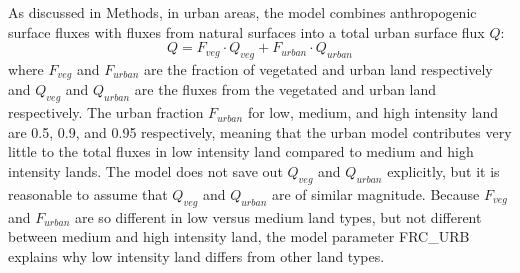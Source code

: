 
As discussed in Methods, in urban areas, the model combines anthropogenic surface fluxes with fluxes from natural surfaces into a total urban surface flux $Q$:
$$ Q= F_{veg} \cdot Q_{veg} + F_{urban} \cdot Q_{urban}$$
where $F_{veg}$ and $F_{urban}$ are the fraction of vegetated and urban land respectively and $Q_{veg}$ and $Q_{urban}$ are the fluxes from the vegetated and urban land respectively. 
The urban fraction $F_{urban}$ for low, medium, and high intensity land are 0.5, 0.9, and 0.95 respectively, meaning that the urban model contributes very little to the total fluxes in low intensity land compared to medium and high intensity lands.
The model does not save out $Q_{veg}$ and $Q_{urban}$ explicitly, but it is reasonable to assume that $Q_{veg}$ and $Q_{urban}$ are of similar magnitude. 
Because $F_{veg}$ and $F_{urban}$ are so different in low versus medium land types, but not different between medium and high intensity land, the model parameter \textsc{FRC\_URB} explains why low intensity land differs from other land types. 


